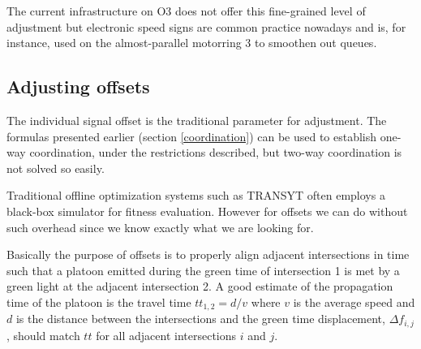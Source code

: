 The current infrastructure on O3 does not offer this fine-grained level of adjustment but electronic speed signs are common practice nowadays and is, for instance, used on the almost-parallel motorring 3 to smoothen out queues.

\subsection{Adjusting offsets}
The individual signal offset is the traditional parameter for adjustment. The formulas presented earlier (section \ref{coordination}) can be used to establish one-way coordination, under the restrictions described, but two-way coordination is not solved so easily.

Traditional offline optimization systems such as TRANSYT often employs a black-box simulator for fitness evaluation. However for offsets we can do without such overhead since we know exactly what we are looking for.

Basically the purpose of offsets is to properly align adjacent intersections in time such that a platoon emitted during the green time of intersection 1 is met by a green light at the adjacent intersection 2. A good estimate of the propagation time of the platoon is the travel time $tt_{1,2} = d / v$ where $v$ is the average speed and $d$ is the distance between the intersections and the green time displacement, $\Delta f_{i,j}$, should match $tt$ for all adjacent intersections $i$ and $j$.

